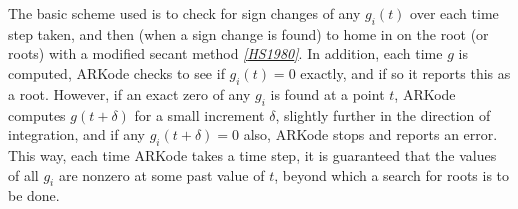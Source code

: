\documentclass[letterpaper,10pt,english]{sphinxmanual}
\begin{document}
The basic scheme used is to check for sign changes of any
\(g_i(t)\) over each time step taken, and then (when a sign change
is found) to home in on the root (or roots) with a modified secant
method \label{Mathematics:id18}{\hyperref[References:hs1980]{\emph{{[}HS1980{]}}}}.  In addition, each time \(g\) is
computed, ARKode checks to see if \(g_i(t) = 0\) exactly, and if
so it reports this as a root. However, if an exact zero of any
\(g_i\) is found at a point \(t\), ARKode computes
\(g(t+\delta)\) for a small increment \(\delta\), slightly
further in the direction of integration, and if any
\(g_i(t+\delta) = 0\) also, ARKode stops and reports an
error. This way, each time ARKode takes a time step, it is guaranteed
that the values of all \(g_i\) are nonzero at some past value of
\(t\), beyond which a search for roots is to be done.
\end{document}
